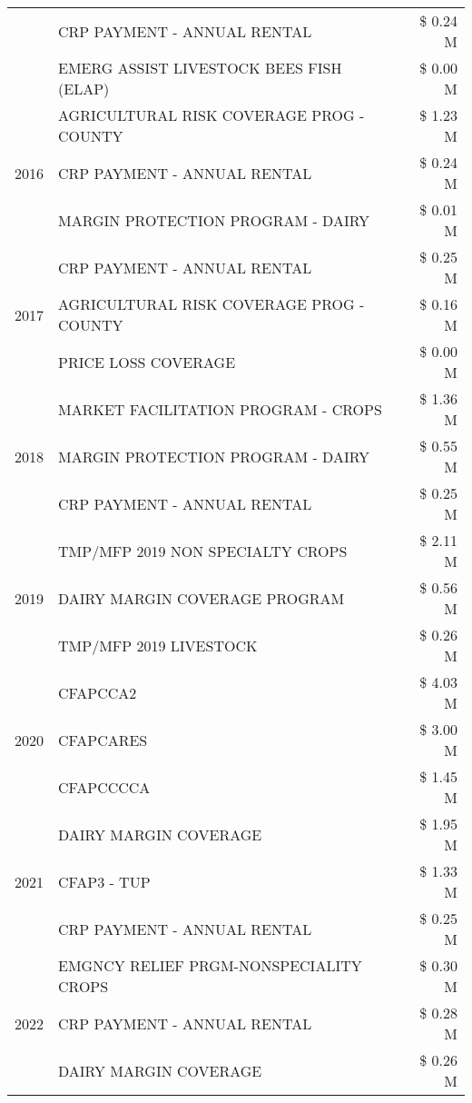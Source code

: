 \begin{tabular}{llr}
 & CRP PAYMENT - ANNUAL RENTAL & \$ 0.24 M \\
 & EMERG ASSIST LIVESTOCK BEES FISH (ELAP) & \$ 0.00 M \\
\cline{1-3}
\multirow[t]{3}{*}{2016} & AGRICULTURAL RISK COVERAGE PROG - COUNTY & \$ 1.23 M \\
 & CRP PAYMENT - ANNUAL RENTAL & \$ 0.24 M \\
 & MARGIN PROTECTION PROGRAM - DAIRY & \$ 0.01 M \\
\cline{1-3}
\multirow[t]{3}{*}{2017} & CRP PAYMENT - ANNUAL RENTAL & \$ 0.25 M \\
 & AGRICULTURAL RISK COVERAGE PROG - COUNTY & \$ 0.16 M \\
 & PRICE LOSS COVERAGE & \$ 0.00 M \\
\cline{1-3}
\multirow[t]{3}{*}{2018} & MARKET FACILITATION PROGRAM - CROPS & \$ 1.36 M \\
 & MARGIN PROTECTION PROGRAM - DAIRY & \$ 0.55 M \\
 & CRP PAYMENT - ANNUAL RENTAL & \$ 0.25 M \\
\cline{1-3}
\multirow[t]{3}{*}{2019} & TMP/MFP 2019 NON SPECIALTY CROPS & \$ 2.11 M \\
 & DAIRY MARGIN COVERAGE PROGRAM & \$ 0.56 M \\
 & TMP/MFP 2019 LIVESTOCK & \$ 0.26 M \\
\cline{1-3}
\multirow[t]{3}{*}{2020} & CFAPCCA2 & \$ 4.03 M \\
 & CFAPCARES & \$ 3.00 M \\
 & CFAPCCCCA & \$ 1.45 M \\
\cline{1-3}
\multirow[t]{3}{*}{2021} & DAIRY MARGIN COVERAGE & \$ 1.95 M \\
 & CFAP3 - TUP & \$ 1.33 M \\
 & CRP PAYMENT - ANNUAL RENTAL & \$ 0.25 M \\
\cline{1-3}
\multirow[t]{3}{*}{2022} & EMGNCY RELIEF PRGM-NONSPECIALITY CROPS & \$ 0.30 M \\
 & CRP PAYMENT - ANNUAL RENTAL & \$ 0.28 M \\
 & DAIRY MARGIN COVERAGE & \$ 0.26 M \\
\cline{1-3}
\bottomrule
\end{tabular}
